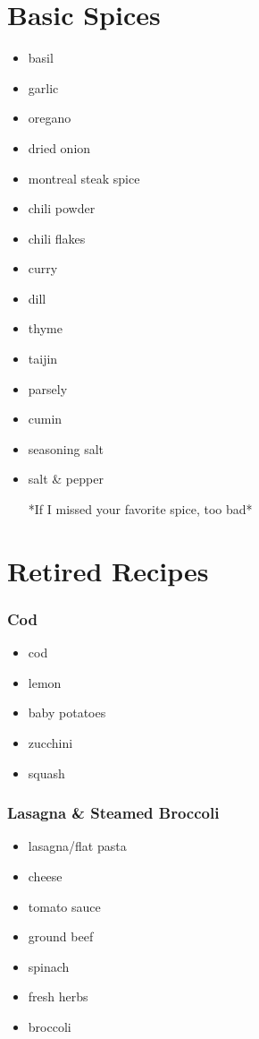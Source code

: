 \documentclass[11pt, a4paper]{article}
\begin{document}
\section{Basic Spices}

\vspace{1pc}

\begin{itemize}
\item basil
\item garlic
\item oregano
\item dried onion
\item montreal steak spice
\item chili powder
\item chili flakes
\item curry
\item dill
\item thyme
\item taijin
\item parsely
\item cumin
\item seasoning salt
\item salt \& pepper
\par
*If I missed your favorite spice, too bad*
\end{itemize}



\pagebreak
\section{Retired Recipes}

\subsubsection{Cod}
\vspace{1pc}
\begin{itemize}
\item cod
\item lemon
\item baby potatoes
\item zucchini
\item squash
\end{itemize}



\subsubsection{Lasagna \& Steamed Broccoli}
\vspace{1pc}
\begin{itemize}
\item lasagna/flat pasta
\item cheese
\item tomato sauce
\item ground beef
\item spinach
\item fresh herbs
\item broccoli
\end{itemize}
\end{document}

